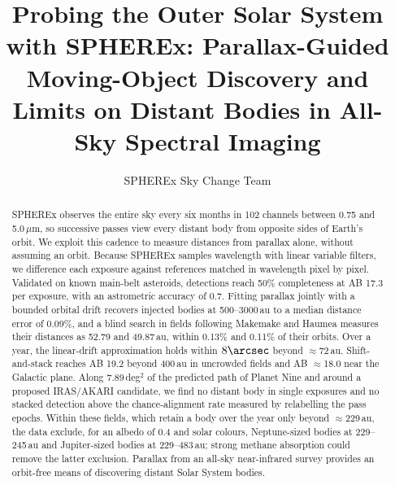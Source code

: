 \documentclass[twocolumn,linenumbers,anonymous]{aastex702}
\begin{document}
\title{Probing the Outer Solar System with SPHEREx: Parallax-Guided Moving-Object Discovery and Limits on Distant Bodies in All-Sky Spectral Imaging}

\author{SPHEREx Sky Change Team}

\begin{abstract}
SPHEREx observes the entire sky every six months in 102 channels between 0.75 and 5.0\,$\mu$m, so successive passes view every distant body from opposite sides of Earth's orbit. We exploit this cadence to measure distances from parallax alone, without assuming an orbit. Because SPHEREx samples wavelength with linear variable filters, we difference each exposure against references matched in wavelength pixel by pixel. Validated on known main-belt asteroids, detections reach 50\% completeness at AB 17.3 per exposure, with an astrometric accuracy of 0.7\arcsec. Fitting parallax jointly with a bounded orbital drift recovers injected bodies at 500--3000\,au to a median distance error of 0.09\%, and a blind search in fields following Makemake and Haumea measures their distances as 52.79 and 49.87\,au, within 0.13\% and 0.11\% of their orbits. Over a year, the linear-drift approximation holds within $8\arcsec$ beyond $\approx$72\,au. Shift-and-stack reaches AB 19.2 beyond 400\,au in uncrowded fields and AB $\approx$18.0 near the Galactic plane. Along 7.89\,deg$^2$ of the predicted path of Planet Nine and around a proposed IRAS/AKARI candidate, we find no distant body in single exposures and no stacked detection above the chance-alignment rate measured by relabelling the pass epochs. Within these fields, which retain a body over the year only beyond $\approx$229\,au, the data exclude, for an albedo of 0.4 and solar colours, Neptune-sized bodies at 229--245\,au and Jupiter-sized bodies at 229--483\,au; strong methane absorption could remove the latter exclusion. Parallax from an all-sky near-infrared survey provides an orbit-free means of discovering distant Solar System bodies.
\end{abstract}

\end{document}
